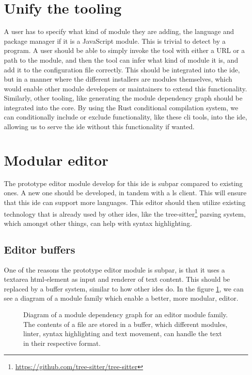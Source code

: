 \section{Unify the tooling}

A user has to specify what kind of module they are adding, the language and
package manager if it is a JavaScript module. This is trivial to detect by a
program. A user should be able to simply invoke the tool with either a URL or a
path to the module, and then the tool can infer what kind of module it is, and
add it to the configuration file correctly. This should be integrated into the
\gls*{ide}, but in a manner where the different installers are modules
themselves, which would enable other module developers or maintainers to
extend this functionality. Similarly, other tooling, like generating the module
dependency graph should be integrated into the core. By using the Rust
conditional compilation system, we can conditionally include or exclude
functionality, like these \gls*{cli} tools, into the \gls*{ide}, allowing us to
serve the \gls*{ide} without this functionality if wanted.


\section{Modular editor}

The prototype editor module develop for this \gls*{ide} is subpar compared to
existing ones. A new one should be developed, in tandem with a \gls*{ls} client.
This will ensure that this \gls*{ide} can support more languages. This editor
should then utilize existing technology that is already used by other
\gls*{ide}s, like the tree-sitter\footnote{\url{https://github.com/tree-sitter/tree-sitter}}
parsing system, which amongst other things, can help with syntax highlighting.

\subsection{Editor buffers}

One of the reasons the prototype editor module is subpar, is that it uses a
textarea \gls*{html}-element as input and renderer of text content. This should
be replaced by a buffer system, similar to how other \gls*{ide}s do. In the
figure \ref{fig:editorBuffer}, we can see a diagram of a module family which
enable a better, more modular, editor.

\begin{figure}
  \centering
  
  \caption{
    Diagram of a module dependency graph for an editor module family. The
    contents of a file are stored in a buffer, which different modules, linter,
    syntax highlighting and text movement, can handle the text in their
    respective format.
  }
  \label{fig:editorBuffer}
\end{figure}

